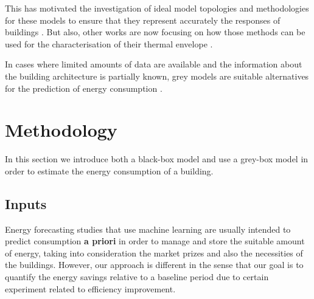\documentclass[10pt, conference, compsocconf]{IEEEtran}
\begin{document}
This has motivated the investigation of ideal model topologies and methodologies for these models to ensure that they represent accurately the responses of buildings \cite{bacher2011identifying}. But also, other works are now focusing on how those methods can be used for the characterisation of their thermal envelope \cite{ramallo2017reliability}.

In cases where limited amounts of data are available and the information about the building architecture is partially known, grey models are suitable alternatives for the prediction of energy consumption \cite{hamzacebi2014forecasting}.












\section{Methodology}

In this section we introduce both a black-box model and use a grey-box model in order to estimate the energy consumption of a building.

\subsection{Inputs}


Energy forecasting studies that use machine learning are usually intended to predict consumption \textbf{a priori} in order to manage and store the suitable amount of energy, taking into consideration the market prizes and also the necessities of the buildings. However, our approach is different in the sense that our goal is to quantify the energy savings relative to a baseline period due to certain experiment related to efficiency improvement. 
\end{document}
